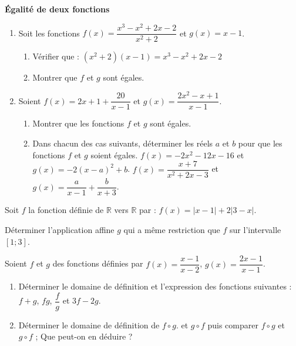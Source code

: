 \documentclass{article}
\begin{document}
 \quad \textbf{Égalité de deux fonctions}

\begin{enumerate}
    \item  Soit les fonctions \( f(x) = \dfrac{x^3 - x^2 + 2x - 2}{x^2 + 2} \) et \( g(x) = x - 1 \).

\begin{enumerate}
    \item Vérifier que :
\( (x^2 + 2)(x - 1) = x^3 - x^2 + 2x - 2 \)
    \item Montrer que \( f \) et \( g \) sont égales.
\end{enumerate}

\item Soient \( f(x) = 2x + 1 + \dfrac{20}{x - 1} \) et
\( g(x) = \dfrac{2x^2 - x + 1}{x - 1}. \)

\begin{enumerate}
\item Montrer que les fonctions \( f \) et \( g \) sont égales.
\item Dans chacun des cas suivants, déterminer les réels \( a \) et \( b \) pour que les fonctions \( f \) et \( g \) soient égales.
\( f(x) = -2x^2 - 12x - 16 \) et \( g(x) = -2(x - a)^2 + b \).
 \( f(x) = \dfrac{x + 7}{x^2 + 2x - 3} \) et \( g(x) = \dfrac{a}{x - 1} + \dfrac{b}{x + 3} \).
\end{enumerate}
\end{enumerate}

 \quad Soit \( f \) la fonction définie de \( \mathbb{R} \) vers \( \mathbb{R} \) par :  
\( f(x) = |x - 1| + 2 |3 - x| \).  

Déterminer l’application affine \( g \) qui a même restriction que \( f \) sur l’intervalle \([1;3]\).

\bigskip

 \quad Soient \( f \) et \( g \) des fonctions définies par  
\( f(x) = \dfrac{x - 1}{x - 2} \), \( g(x) = \dfrac{2x - 1}{x - 1} \).

\begin{enumerate}
    \item Déterminer le domaine de définition et l’expression des fonctions suivantes : \( f + g \), \( fg \), \( \dfrac{f}{g} \) et \( 3f - 2g \).
    \item Déterminer le domaine de définition de \( f \circ g \). et \( g \circ f \) puis comparer \( f \circ g \) et \( g \circ f \) ; Que peut-on en déduire ?
\end{enumerate}
\end{document}
